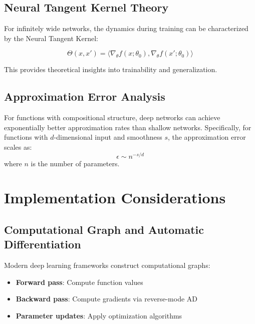 \subsection{Neural Tangent Kernel Theory}

For infinitely wide networks, the dynamics during training can be characterized by the Neural Tangent Kernel:

\begin{equation}
\Theta(x, x') = \langle \nabla_\theta f(x; \theta_0), \nabla_\theta f(x'; \theta_0) \rangle
\end{equation}

This provides theoretical insights into trainability and generalization.

\subsection{Approximation Error Analysis}

\begin{theorem}
For functions with compositional structure, deep networks can achieve exponentially better approximation rates than shallow networks. Specifically, for functions with $d$-dimensional input and smoothness $s$, the approximation error scales as:
\begin{equation}
\epsilon \sim n^{-s/d}
\end{equation}
where $n$ is the number of parameters.
\end{theorem}

\section{Implementation Considerations}

\subsection{Computational Graph and Automatic Differentiation}

Modern deep learning frameworks construct computational graphs:

\begin{itemize}
\item \textbf{Forward pass}: Compute function values
\item \textbf{Backward pass}: Compute gradients via reverse-mode AD
\item \textbf{Parameter updates}: Apply optimization algorithms
\end{itemize}

